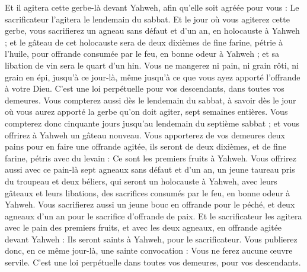 \begin{multicols}{2}
Et il agitera cette gerbe-là devant Yahweh, afin qu'elle soit agréée pour vous : Le sacrificateur l’agitera le lendemain du sabbat.
Et le jour où vous agiterez cette gerbe, vous sacrifierez un agneau sans défaut et d'un an, en holocauste à Yahweh ;
et le gâteau de cet holocauste sera de deux dixièmes de fine farine, pétrie à l'huile, pour offrande consumée par le feu, en bonne odeur à Yahweh ; et sa libation de vin sera le quart d'un hin.
Vous ne mangerez ni pain, ni grain rôti, ni grain en épi, jusqu'à ce jour-là, même jusqu'à ce que vous ayez apporté l'offrande à votre Dieu. C’est une loi perpétuelle pour vos descendants, dans toutes vos demeures.
Vous compterez aussi dès le lendemain du sabbat, à savoir dès le jour où vous aurez apporté la gerbe qu'on doit agiter, sept semaines entières.
Vous compterez donc cinquante jours jusqu'au lendemain du septième sabbat ; et vous offrirez à Yahweh un gâteau nouveau.
Vous apporterez de vos demeures deux pains pour en faire une offrande agitée, ils seront de deux dixièmes, et de fine farine, pétris avec du levain : Ce sont les premiers fruits à Yahweh.
Vous offrirez aussi avec ce pain-là sept agneaux sans défaut et d'un an, un jeune taureau pris du troupeau et deux béliers, qui seront un holocauste à Yahweh, avec leurs gâteaux et leurs libations, des sacrifices consumés par le feu, en bonne odeur à Yahweh.
Vous sacrifierez aussi un jeune bouc en offrande pour le péché, et deux agneaux d'un an pour le sacrifice d’offrande de paix.
Et le sacrificateur les agitera avec le pain des premiers fruits, et avec les deux agneaux, en offrande agitée devant Yahweh : Ils seront saints à Yahweh, pour le sacrificateur.
Vous publierez donc, en ce même jour-là, une sainte convocation : Vous ne ferez aucune œuvre servile. C’est une loi perpétuelle dans toutes vos demeures, pour vos descendants.

\end{multicols}
